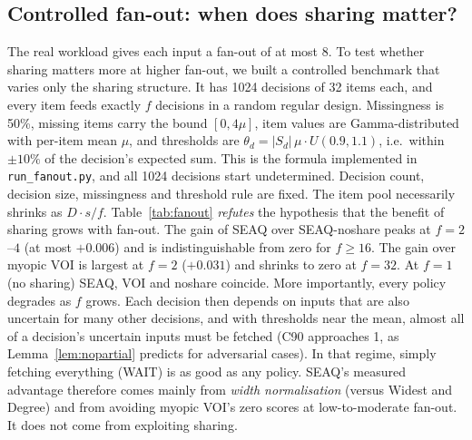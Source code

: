 \documentclass[conference]{IEEEtran}
\newcommand{\seaq}{SEAQ\xspace}
\begin{document}
\subsection{Controlled fan-out: when does sharing matter?}
\label{sec:fanout}

The real workload gives each input a fan-out of at most 8. To test whether sharing matters more at higher fan-out,
we built a controlled benchmark that varies only the sharing structure. It has 1024 decisions of 32 items each, and every
item feeds exactly $f$ decisions in a random regular design. Missingness is 50\%, missing items carry the bound
$[0,4\mu]$, item values are Gamma-distributed with per-item mean $\mu$, and thresholds are $\theta_d=|S_d|\,\mu\cdot U(0.9,1.1)$, i.e.\ within
$\pm10\%$ of the decision's expected sum. This is the formula implemented in \texttt{run\_fanout.py}, and all 1024 decisions start
undetermined. Decision count,
decision size, missingness and threshold rule are fixed. The item pool necessarily shrinks as $D\cdot s/f$.
Table~\ref{tab:fanout} \emph{refutes} the hypothesis that the benefit of sharing grows with fan-out. The gain of
\seaq{} over SEAQ-noshare peaks at $f=2$--$4$ (at most $+0.006$) and is indistinguishable from zero for $f\ge 16$. The gain
over myopic VOI is largest at $f=2$ ($+0.031$) and shrinks to zero at $f=32$. At $f=1$ (no sharing) \seaq, VOI and
noshare coincide. More importantly, every policy degrades as $f$ grows. Each decision then depends on inputs that
are also uncertain for many other decisions, and with thresholds near the mean, almost all of a decision's
uncertain inputs must be fetched (C90 approaches 1, as Lemma~\ref{lem:nopartial} predicts for adversarial cases).
In that regime, simply fetching everything (WAIT) is as good as any policy. \seaq's measured advantage therefore
comes mainly from \emph{width normalisation} (versus Widest and Degree) and from avoiding myopic VOI's zero
scores at low-to-moderate fan-out. It does not come from exploiting sharing.
\end{document}
